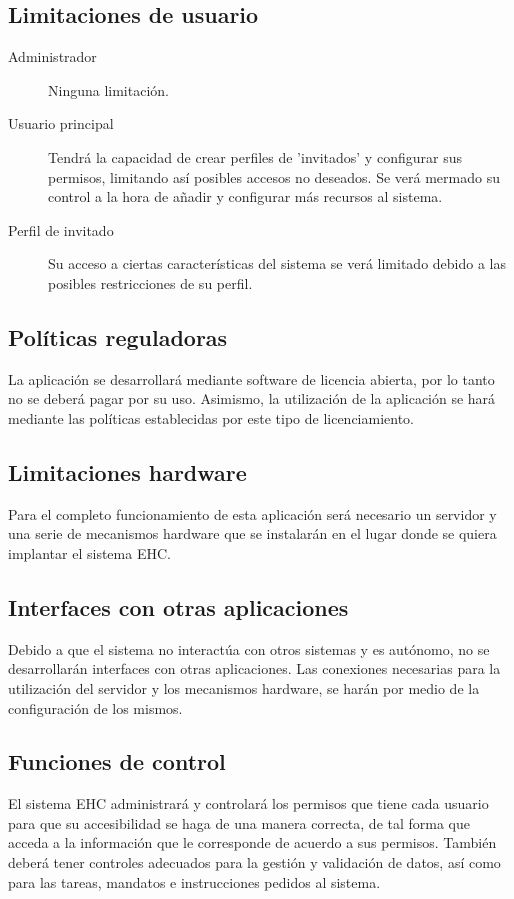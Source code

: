 \subsection{Limitaciones de usuario}
\begin{description}
\item[Administrador] Ninguna limitaci\'on.        

\item[Usuario principal] Tendr\'a la capacidad de crear perfiles de 'invitados' y configurar sus permisos, limitando as\'i posibles accesos no deseados. Se ver\'a mermado su control a la hora de a\~nadir y configurar m\'as recursos al sistema.

\item[Perfil de invitado] Su acceso a ciertas caracter\'isticas del sistema se ver\'a limitado debido a las posibles restricciones de su perfil.
\end{description}

\subsection{Pol\'iticas reguladoras}
La aplicaci\'on se desarrollar\'a mediante software de licencia abierta, por lo tanto no se deber\'a pagar por su uso. Asimismo, la utilizaci\'on de la aplicaci\'on se har\'a mediante las pol\'iticas establecidas por este tipo de licenciamiento.

\subsection{Limitaciones hardware}
Para el completo funcionamiento de esta aplicaci\'on ser\'a necesario un servidor y una serie de mecanismos hardware que se instalar\'an en el lugar donde se quiera implantar el sistema EHC.

\subsection{Interfaces con otras aplicaciones}
Debido a que el sistema no interact\'ua con otros sistemas y es aut\'onomo, no se desarrollar\'an interfaces con otras aplicaciones. Las conexiones necesarias para la utilizaci\'on del servidor y los mecanismos hardware, se har\'an por medio de la configuraci\'on de los mismos.


\subsection{Funciones de control}
El sistema EHC administrar\'a y controlar\'a los permisos que tiene cada usuario para que su accesibilidad se haga de una manera correcta, de tal forma que acceda a la informaci\'on que le corresponde de acuerdo a sus permisos. Tambi\'en deber\'a tener controles adecuados para la gesti\'on y validaci\'on de datos, as\'i como para las tareas, mandatos e instrucciones pedidos al sistema. 

